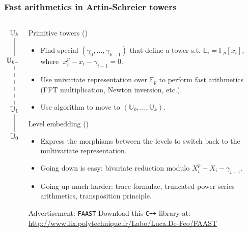 \documentclass[10pt]{beamer}
\newcommand{\blue}[1]{\textcolor{blue}{#1}}  %
\newcommand{\LK}{\mathbb{L}}  %
\newcommand{\U}{\mathbb{U}}  %
\newcommand{\F}{\mathbb{F}}  %
\newcommand{\0}{\mathcal{O}}  %
\begin{document}
\begin{frame}
  \frametitle{Fast arithmetics in Artin-Schreier towers}

  \begin{columns}
    \begin{column}{0.1\textwidth}
      \Large\[\xymatrix{
        \U_k\ar@{-}[d]\\
        \U_{k-1} \ar@{--}[dd]\\
        \\
        \U_1 \ar@{-}[d]\\
        \U_0
      }\]
    \end{column}
    \begin{column}{0.85\textwidth}
      \vspace{-3mm}
      \begin{block}{Primitive towers (\cite{DFS09})}
        \begin{itemize}
        \item Find special $(\gamma_0,\ldots,\gamma_{k-1})$ that
          define a tower s.t. $\LK_i = \F_p[x_i]$, where
          $\;x_i^p-x_i-\gamma_{i-1}=0$.
        \item Use univariate representation over $\F_p$ to perform
          fast arithmetics (FFT multiplication, Newton inversion,
          etc.).
        \item Use \cite{Couveignes00} algorithm to move to
          $(\U_0,\ldots,\U_k)$.
        \end{itemize}
      \end{block}
      
      \vspace{-3mm}
      \begin{block}{Level embedding (\cite{DFS09})}
        \begin{itemize}
        \item Express the morphisms between the levels to switch back
          to the multivariate representation.
        \item Going down is easy: bivariate reduction modulo
          $X_i^p-X_i-\gamma_{i-1}$.
        \item Going up much harder: trace formulae, truncated power
          series arithmetics, transposition principle.
        \end{itemize}
      \end{block}

      \vspace{-3mm}
      \begin{block}{Advertisement: \texttt{FAAST}}
        Download this \texttt{C++} library at:
        \blue{\url{http://www.lix.polytechnique.fr/Labo/Luca.De-Feo/FAAST}}
      \end{block}
    \end{column}
  \end{columns}
\end{frame}
\end{document}
